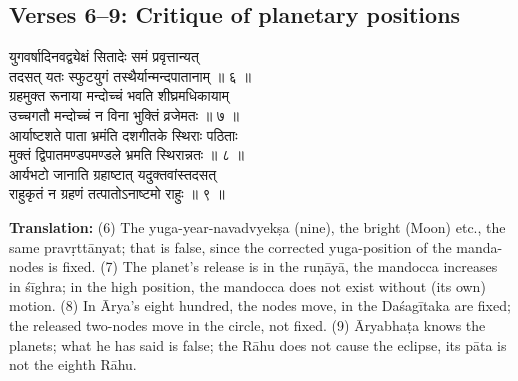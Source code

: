 \documentclass[11pt,a4paper]{article}
\newcommand{\dev}[1]{{\devanagarifont #1}}
\newcommand{\sanskritcol}[1]{%
  \begin{minipage}[t]{0.47\textwidth}
  \vspace{0pt}
  \begin{flushleft}
  #1
  \end{flushleft}
  \end{minipage}%
  \hfill
}
\newcommand{\englishcol}[1]{%
  \begin{minipage}[t]{0.47\textwidth}
  \vspace{0pt}
  \begin{flushleft}
  #1
  \end{flushleft}
  \end{minipage}%
}
\begin{document}
\subsection*{Verses 6--9: Critique of planetary positions}

\noindent
\sanskritcol{\dev{युगवर्षादिनवद्व्येक्षं सितादेः समं प्रवृत्तान्यत्} \\ \dev{तदसत् यतः स्फुटयुगं तस्थैर्यान्मन्दपातानाम् ॥ ६ ॥} \\[0.2cm]
\dev{ग्रहमुक्त रूनाया मन्दोच्चं भवति शीघ्रमधिकायाम्} \\ \dev{उच्चगतौ मन्दोच्चं न विना भुक्तिं व्रजेमतः ॥ ७ ॥} \\[0.2cm]
\dev{आर्याष्टशते पाता भ्रमंति दशगीतके स्थिराः पठिताः} \\ \dev{मुक्तं द्विपातमण्डपमण्डले भ्रमति स्थिरान्नतः ॥ ८ ॥} \\[0.2cm]
\dev{आर्यभटो जानाति ग्रहाष्टात् यदुक्तवांस्तदसत्} \\ \dev{राहुकृतं न ग्रहणं तत्पातोऽनाष्टमो राहुः ॥ ९ ॥}}
\englishcol{\textbf{Translation:} (6) The yuga-year-navadvyekṣa (nine), the bright (Moon) etc.,
the same pravṛttānyat; that is false, since the corrected yuga-position of the
manda-nodes is fixed. (7) The planet's release is in the ruṇāyā, the mandocca
increases in śīghra; in the high position, the mandocca does not exist without
(its own) motion. (8) In Ārya's eight hundred, the nodes move, in the Daśagītaka
are fixed; the released two-nodes move in the circle, not fixed. (9) Āryabhaṭa
knows the planets; what he has said is false; the Rāhu does not cause the eclipse,
its pāta is not the eighth Rāhu.}
\end{document}
